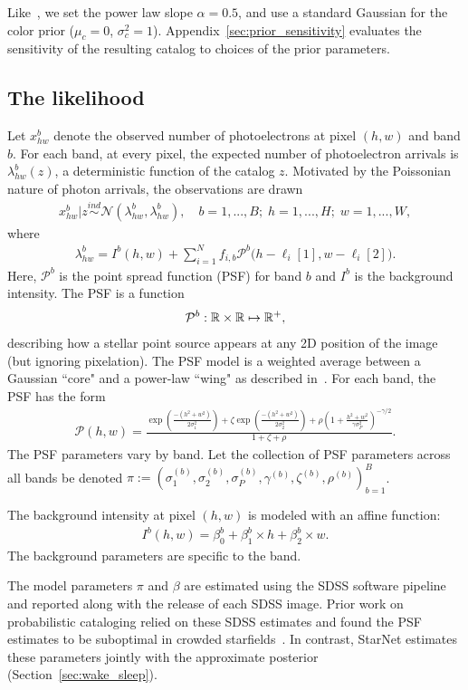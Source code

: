 Like~\cite{Feder_2019}, we set the power law slope $\alpha = 0.5$, and use a standard Gaussian for the color prior ($\mu_c = 0$, $\sigma^2_c = 1$). 
Appendix~\ref{sec:prior_sensitivity} evaluates the 
sensitivity of the resulting catalog to choices of the prior parameters. 

\subsection{The likelihood}
Let $x_{hw}^b$ denote the observed number of photoelectrons at pixel $(h,w)$ and band $b$. For each band, at every pixel, the expected number of photoelectron arrivals is $\lambda^b_{hw}(z)$, a deterministic function of the catalog $z$. Motivated by the Poissonian nature of photon arrivals, the observations are drawn
\begin{align}
  x_{hw}^b | z \overset{ind}{\sim} \mathcal{N}(\lambda^b_{hw}, \lambda^b_{hw}),
  \quad 
  b = 1, ..., B; \;
  h = 1,..., H; \; 
  w = 1, ..., W, 
\end{align}
where 
\begin{align}
  \lambda^b_{hw} = I^{b}(h, w) + \sum_{i = 1}^N f_{i,b} \mathcal{P}^b\big(h - \ell_{i}[1], w - \ell_{i}[2]\big).
  \label{eq:expected_intensity}
\end{align}
Here, $\mathcal{P}^b$ is the point spread function (PSF) for band $b$ and $I^{b}$ is the background intensity. The PSF is a function 
\begin{align}
\mathcal{P}^b : \mathbb{R} \times \mathbb{R} \mapsto \mathbb{R}^+,
\end{align}
describing how a stellar point source appears at any 2D position of the image (but ignoring pixelation). The PSF model is a weighted average between a Gaussian ``core" and a power-law ``wing" as described in~\cite{Xin2018psf}. For each band, the PSF has the form
\begin{align}
    \mathcal{P}(h, w) = \frac{\exp(\frac{-(h^2 + w^2)}{2\sigma_1^2}) + 
                            \zeta \exp(\frac{-(h^2 + w^2)}{2\sigma_2^2}) + 
                            \rho(1 + \frac{h^2 + w^2}{\gamma\sigma^2_P})^{-\gamma/2} }{1 + \zeta + \rho}.
\end{align}
The PSF parameters vary by band. Let the collection of PSF parameters across all bands be denoted $\pi := (\sigma_{1}^{(b)}, \sigma_{2}^{(b)}, \sigma_{P}^{(b)}, \gamma^{(b)}, \zeta^{(b)}, \rho^{(b)})_{b=1}^B$.

The background intensity at pixel $(h,w)$ is modeled with an affine function: 
\begin{align}
    I^{b}(h,w) = \beta_0^{b} + \beta_1^{b} \times h + \beta_2^{b} \times w.
\end{align}
The background parameters are specific to the band. 

The model parameters $\pi$ and $\beta$ are estimated using the SDSS software pipeline and reported along with the release of each SDSS image.
Prior work on probabilistic cataloging relied 
on these SDSS estimates and found the PSF estimates to be suboptimal in crowded starfields~\cite{Feder_2019}. 
In contrast, StarNet estimates these parameters jointly with the approximate posterior (Section~\ref{sec:wake_sleep}). 

